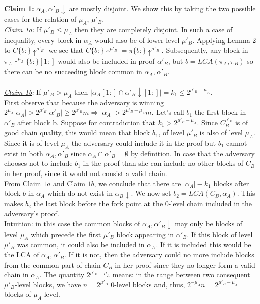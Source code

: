 \textbf{Claim 1:} $\alpha_A, \alpha'_B\downarrow$ are mostly disjoint. We show
this by taking the two possible cases for the relation of $\mu_A$, $\mu'_B$.\\
\textit{\underline{Claim 1a}:} If $\mu'_B \leq \mu_A$ then they are completely
disjoint. In such a case of inequality, every block in $\alpha_A$ would also be
of lower level $\mu'_B$. Applying Lemma 2 to $C\{b:\}\uparrow^{\mu'_B}$  we see
that $C\{b:\}\uparrow^{\mu'_B} = \pi\{b:\}\uparrow^{\mu'_B}$. Subsequently, any
block in $\pi_A\uparrow^{\mu_A}\{b:\}[1:]$ would also be included in proof
$\alpha'_B$, but $b=LCA(\pi_A, \pi_B)$ so there can be no succeeding block
common in $\alpha_A, \alpha'_B$. \\
\\
\textit{\underline{Claim 1b}:} If  $\mu'_B > \mu_A$ then $\vert \alpha_A[1:] 
\cap \alpha'_B\downarrow[1:] \vert = k_1 \leq 2^{\mu'_B - \mu_A}$.\\
First observe that because the adversary is winning $2^{\mu_A} \vert \alpha_A \vert 
> 2^{\mu'_B} \vert \alpha'_B \vert \geq 2^{\mu'_B} m \Rightarrow \vert \alpha_A \vert 
> 2^{\mu'_B - \mu_A}m$.
Let's call $b_1$ the first block in $\alpha'_B$ after block b.
Suppose for contradiction that $k_1 > 2^{\mu'_B - \mu_A}$.  Since $C_B^{\mu'_B}$ is
of good chain quality, this would mean that block $b_1$, of level $\mu'_B$ is also
of level $\mu_A$. Since it is of level $\mu_A$ the adversary could include it in
the proof but $b_1$ cannot exist in both $\alpha_A, \alpha'_B$ since $\alpha_A
\cap \alpha'_B = \emptyset$ by definition. In case that the adversary chooses not
to include $b_1$ in the proof than she can include no other blocks of $C_B$ in
her proof, since it would not consist a valid chain.  \\


From Claim $1a$ and Claim $1b$, we conclude that there are $\vert \alpha_A
\vert - k_1$ blocks after block $b$ in $\alpha_A$ which do not exist in
$\alpha_B\downarrow$. We now set $b_2 = LCA(C_B, \alpha_A)$. This makes $b_2$
the last block before the fork point at the 0-level chain included in the adversary's proof.\\

Intuition: in this case the common blocks of $\alpha_A, \alpha'_B\downarrow$
may only be blocks of level $\mu_A$ which precede the first $\mu'_B$ block
appearing in $\alpha'_B$. If this block of level $\mu'_B$ was common, it could
also be included in $\alpha_A$. If it is included this would be the LCA of
$\alpha_A, \alpha'_B$. If it is not, then the adversary could no more include
blocks from the common part of chain $C_B$ in her proof since they no longer
form a valid chain in $\alpha_A$. The quantity $2^{\mu'_B - \mu_A}$ means: in
the range between two consequent $\mu'_B$-level blocks, we have $n = 2^{\mu'_B}$
0-level blocks and, thus, $2^{-\mu_A}n = 2^{\mu'_B - \mu_A}$ blocks of $\mu_A$-level. \\


